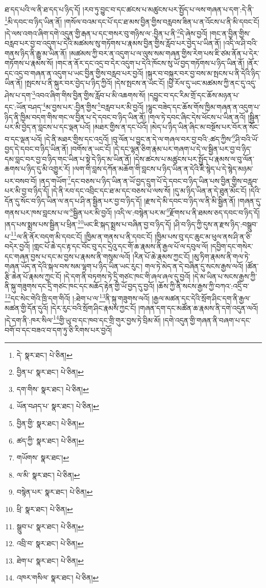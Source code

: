 ཐ་དད་པའི་ལ་ནི་ཐ་དད་པ་ཉིད་དོ། །རབ་ཏུ་བྱུང་བ་དང་ཚངས་པ་མཚུངས་པར་སྤྱོད་པ་ལས་གཞན་པ་དག་:དེ་ནི་\footnote{དེ་  སྣར་ཐང་།  པེ་ཅིན། }མི་དབང་བ་ཉིད་ཡིན་ནོ། །གསོལ་བའམ་དང་པོ་དང་ཐ་མས་བྱིན་གྱིས་བརླབས་ཟིན་པ་ན་འོངས་པ་ནི་མི་དབང་ངོ། །དེ་ལས་འགའ་ཞིག་དགེ་འདུན་གྱི་རྒན་པ་དང་གསར་བུ་གཉིས་ལ་:བྱིན་པ་ནི་\footnote{བྱིན་པ་  སྣར་ཐང་།  པེ་ཅིན། }དེ་ཞེས་བྱའོ། །གང་ན་བྱིན་གྱིས་བརླབ་པར་བྱ་བ་འདུག་པ་དེའི་མཚམས་སུ་གཏོགས་པ་རྣམས་བྱིན་གྱིས་རློབ་པར་བྱེད་པ་ཡིན་ནོ། །འདི་ལ་ཤི་བའི་གནས་ཉིད་ནི་རྒྱུ་མ་ཡིན་ནོ། །མཚམས་ཀྱི་བར་ན་འདུག་པ་ལ་ལུས་སམ་གཞན་གྱིས་རེག་པས་ཇི་ཙམ་ནོན་པ་དེར་གཏོགས་པ་རྣམས་སོ། །གང་ན་ནོར་དང་འདྲ་བ་དེར་འདུག་པ་དེའི་ཁོངས་སུ་ཡོ་བྱད་གཏོགས་པ་ཉིད་ཡིན་ནོ། །ནོར་དང་འདྲ་བ་གཞན་ན་འདུག་པ་ཡང་བྱིན་གྱིས་བརླབ་པར་བྱའོ། །སྐུར་བ་བསྐུར་བར་བྱ་བས་མ་སྤངས་པ་ནི་དེའི་ཉིད་ཡིན་ནོ། །སྤངས་པ་ནི་སྐུར་བར་བྱེད་པ་ཉིད་ཀྱིའོ། །དེས་སྤངས་ན་ཡང་ངོ། །ཕྱི་རོལ་དུ་ཡང་མཚམས་ཀྱི་ནང་དུ་འདུ་ཤེས་པ་དག་\footnote{དག་གིས་  སྣར་ཐང་།  པེ་ཅིན། }འབའ་ཞིག་གིས་བྱིན་གྱིས་རློབ་པ་མི་འཆགས་སོ། །དབྱུང་བ་དང་རིམ་གྲོ་དང་ཆོས་མཉན་པ་དང་:ཡོན་བཤད་\footnote{ཡོན་བཤད་པ་  སྣར་ཐང་།  པེ་ཅིན། }མ་བྱས་པར་:བྱིན་གྱིས་\footnote{བྱིན་གྱི་  སྣར་ཐང་།  པེ་ཅིན། }བརླབ་པར་མི་བྱའོ། །ལྷུང་བཟེད་དང་ཆོས་གོས་ཁྱིམ་གཞན་ན་འདུག་པ་ཉིད་ནི་ཁྱིམ་བདག་གིས་གང་ལ་བྱིན་པ་དེ་དབང་བ་ཉིད་ཡིན་ནོ། །གལ་ཏེ་དབང་ཞིང་དེས་ཕོངས་པ་ཡིན་ནའོ། །སྦྱིན་པར་མི་བྱེད་ན་བླངས་པ་དང་ལྡན་པའོ། །མཐར་གྱིས་ན་དང་པོའོ། །མེད་པ་ཉིད་ཡིན་ཞིང་མ་བསྔོས་པར་བོར་ན་སོང་བ་དང་ལྡན་པའོ། །དེ་ནི་མཐར་གྱིས་དང་འདྲའོ། །བུ་ལོན་པ་བྱུང་ན་དེ་ལ་གཞལ་བར་བྱ་བའི་:ཚད་ཀྱིས་\footnote{ཚད་ཀྱི་  སྣར་ཐང་།  པེ་ཅིན། }ཤི་བའི་ཡོ་བྱད་དེ་དབང་བ་ཉིད་ཡིན་ནོ། །བགོས་ན་ཡང་ངོ། །དེ་དང་ལྷན་ཅིག་རྣམ་པར་གཞག་པ་དེ་ལ་སྦྱིན་པར་བྱ་བ་ཉིད་དམ་བླང་བར་བྱ་བ་ཉིད་གང་ཡིན་པ་སྟེ་དེ་ཉིད་མ་ཡིན་ནོ། །དེས་ཚངས་པ་མཚུངས་པར་སྤྱོད་པ་རྣམས་ལ་བུ་ལོན་ཆགས་པ་ཉིད་དུ་མི་འགྱུར་རོ། །ལག་གི་བླས་དཀོན་མཆོག་གི་བླངས་པ་ཉིད་ཡིན་ན་དེའི་ཇི་སྙེད་པ་དེ་སྙེད་མཉམ་པར་བསབ་བོ། །ནད་གཡོག་\footnote{གཡོགས་  སྣར་ཐང་། }དང་བཅས་པ་ཉིད་ཡིན་ན་ཡོ་བྱད་དྲུག་པོ་དེ་དབང་བ་ཉིད་ཡིན་པས་བྱིན་གྱིས་བརླབ་པར་མི་བྱ་བ་ཉིད་དོ། །དེ་ནི་རབ་དང་འབྲིང་དང་ཐ་མ་དང་བཅས་པ་ལས་སོ། །དུ་མ་ཉིད་ཡིན་ན་དེ་ཐུན་མོང་ངོ། །དེའི་དོན་དུ་སོང་བ་ཉིད་ཡིན་ལ་ནད་པ་ཤི་ན་སྦྱིན་པར་བྱ་བ་ཉིད་དོ། །རྫས་དེ་མི་དབང་བ་ཉིད་ལ་ནི་མི་སྦྱིན་ནོ། །གཞན་དུ་གནས་པར་ཁས་བླངས་པ་ལ་\footnote{ལ་མི་  སྣར་ཐང་།  པེ་ཅིན། }སྦྱིན་པར་མི་བྱའོ། །འདི་ལ་:བསྙེན་པར་མ་\footnote{བསྙེན་པར་  སྣར་ཐང་།  པེ་ཅིན། }རྫོགས་པ་ནི་ཐམས་ཅད་དབང་བ་ཉིད་དོ། །ནད་པས་སྨྲས་པས་སྦྱིན་པ་ཕྲིན་\footnote{ཕྲི་  སྣར་ཐང་།  པེ་ཅིན། }ཡང་ཇི་སྐད་སྨྲས་པ་བཞིན་བྱ་བ་ཉིད་དོ། །ཤི་བ་ཉིད་ཀྱི་དུས་ན་རྫས་ཉིད་:བསྒྲུབ་པ་\footnote{སྒྲུབ་པ་  སྣར་ཐང་།  པེ་ཅིན། }ལ་ནི་ནོར་བདག་མི་དབང་ངོ། །ཁྱིམ་ན་གནས་པ་ནི་དབང་ངོ། །ཁྱིམ་པས་བུ་དང་ཆུང་མ་ཕུལ་ནས་ཤི་ན་ཅི་བདེར་བྱའོ། །གླང་པོ་ཆེ་དང་རྟ་དང་བོང་བུ་དང་དྲེའུ་དང་གོ་ཆ་རྣམས་ནི་རྒྱལ་པོ་ལ་དབུལ་ལོ། །དབྱིག་དང་གསེར་དང་གཞན་བྱས་པ་དང་མ་བྱས་པ་རྣམས་ནི་གསུམ་ལའོ། །རིན་པོ་ཆེ་རྣམས་ཀྱང་ངོ། །མུ་ཏིག་རྣམས་ནི་གལ་ཏེ་གཞན་ཡོད་ན་དེའི་སྐལ་བས་སམ་ལྷག་པ་ཉིད་ཡིན་ཡང་རུང་། གལ་ཏེ་མེད་ན་དེ་བཞིན་དུ་སངས་རྒྱས་ལའོ། །ཚོན་རྩི་ཆེན་པོ་རྣམས་ཀྱང་ངོ། །དེ་དག་ནི་བཏགས་ཏེ་དྲི་གཙང་ཁང་གི་ཞལ་ཞལ་དུ་བྱའོ། །དེ་མ་ཡིན་པ་སངས་རྒྱས་ཀྱི་ནི་སྐུ་གཟུགས་དང་དྲི་གཙང་ཁང་དང་མཆོད་རྟེན་གྱི་ཡོ་བྱད་དུ་བྱའོ། །ཆོས་ཀྱི་ནི་སངས་རྒྱས་ཀྱི་བཀའ་:འདྲི་བ་\footnote{འབྲི་བ་  སྣར་ཐང་།  པེ་ཅིན། }དང་སེང་གེའི་ཁྲི་དག་གིའོ། །:ཐེག་པ་ལ་\footnote{ཐེག་པ་  སྣར་ཐང་།  པེ་ཅིན། }ནི་སྐུ་གཟུགས་ལའོ། །རྒྱལ་མཚན་དང་དེའི་སྲོག་ཤིང་དག་ནི་རྒྱལ་མཚན་གྱི་དོན་དུའོ། །དེར་རུང་བའི་སྲོག་ཤིང་རྣམས་ཀྱང་ངོ། །གཞན་དག་དང་མཚོན་ཆ་རྣམས་ནི་དགེ་འདུན་ལའོ། །དེ་དག་ནི་:ཁར་སིལ་\footnote{འཁར་གསིལ་  སྣར་ཐང་།  པེ་ཅིན། }གྱི་ཡུ་བ་དང་ཁབ་དང་གྲི་གུར་བྱས་ཏེ་བྲིམ་མོ། །དགེ་འདུན་གྱི་གཞན་ནི་བཞག་པ་དང་བགོ་བ་དང་བཟའ་བ་དག་ཏུ་ཅི་རིགས་པར་བྱའོ། 